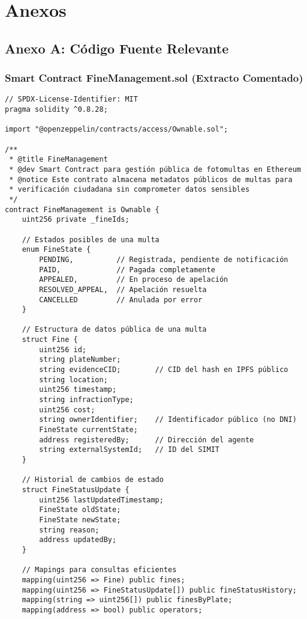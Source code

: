 \section{Anexos}

\subsection{Anexo A: Código Fuente Relevante}

\subsubsection{Smart Contract FineManagement.sol (Extracto Comentado)}

\begin{verbatim}
// SPDX-License-Identifier: MIT
pragma solidity ^0.8.28;

import "@openzeppelin/contracts/access/Ownable.sol";

/**
 * @title FineManagement
 * @dev Smart Contract para gestión pública de fotomultas en Ethereum
 * @notice Este contrato almacena metadatos públicos de multas para
 * verificación ciudadana sin comprometer datos sensibles
 */
contract FineManagement is Ownable {
    uint256 private _fineIds;

    // Estados posibles de una multa
    enum FineState { 
        PENDING,          // Registrada, pendiente de notificación
        PAID,             // Pagada completamente
        APPEALED,         // En proceso de apelación
        RESOLVED_APPEAL,  // Apelación resuelta
        CANCELLED         // Anulada por error
    }

    // Estructura de datos pública de una multa
    struct Fine {
        uint256 id;
        string plateNumber;
        string evidenceCID;        // CID del hash en IPFS público
        string location;
        uint256 timestamp;
        string infractionType;
        uint256 cost;
        string ownerIdentifier;    // Identificador público (no DNI)
        FineState currentState;
        address registeredBy;      // Dirección del agente
        string externalSystemId;   // ID del SIMIT
    }

    // Historial de cambios de estado
    struct FineStatusUpdate {
        uint256 lastUpdatedTimestamp;
        FineState oldState;
        FineState newState;
        string reason;
        address updatedBy;
    }

    // Mapings para consultas eficientes
    mapping(uint256 => Fine) public fines;
    mapping(uint256 => FineStatusUpdate[]) public fineStatusHistory;
    mapping(string => uint256[]) public finesByPlate;
    mapping(address => bool) public operators;


\end{verbatim}
